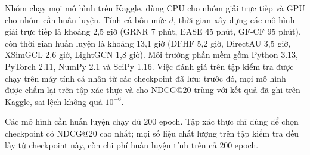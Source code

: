 \label{sec:runtime-protocol}

Nhóm chạy mọi mô hình trên Kaggle, dùng CPU cho nhóm giải trực tiếp và GPU cho nhóm cần huấn luyện. Tính cả bốn mức $d$, thời gian xây dựng các mô hình giải trực tiếp là khoảng 2,5 giờ (GRNR 7 phút, EASE 45 phút, GF-CF 95 phút), còn thời gian huấn luyện là khoảng 13,1 giờ (DFHF 5,2 giờ, DirectAU 3,5 giờ, XSimGCL 2,6 giờ, LightGCN 1,8 giờ). Môi trường phần mềm gồm Python 3.13, PyTorch 2.11, NumPy 2.1 và SciPy 1.16. Việc đánh giá trên tập kiểm tra được chạy trên máy tính cá nhân từ các checkpoint đã lưu; trước đó, mọi mô hình được chấm lại trên tập xác thực và cho NDCG@20 trùng với kết quả đã ghi trên Kaggle, sai lệch không quá $10^{-6}$.

Các mô hình cần huấn luyện chạy đủ 200 epoch. Tập xác thực chỉ dùng để chọn checkpoint có NDCG@20 cao nhất; mọi số liệu chất lượng trên tập kiểm tra đều lấy từ checkpoint này, còn chi phí huấn luyện tính trên cả 200 epoch.